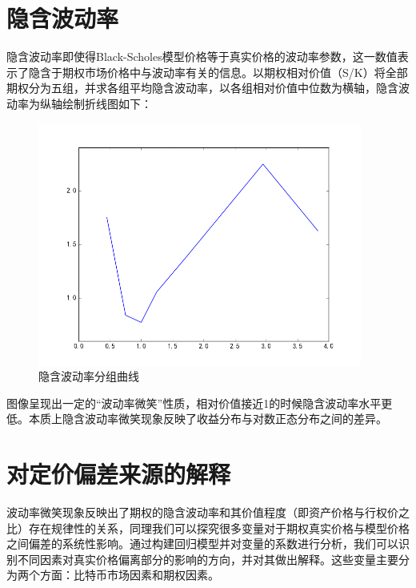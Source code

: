 {\section{隐含波动率}
隐含波动率即使得Black-Scholes模型价格等于真实价格的波动率参数，这一数值表示了隐含于期权市场价格中与波动率有关的信息。以期权相对价值（S/K）将全部期权分为五组，并求各组平均隐含波动率，以各组相对价值中位数为横轴，隐含波动率为纵轴绘制折线图如下：
\begin{figure}[H]
\begin{small}
\begin{center}
\includegraphics[width=0.95\textwidth]{figures/mean_isd.png}
\end{center}
\caption{隐含波动率分组曲线}
\label{fig:mean_isd}
\end{small}
\end{figure}
图像呈现出一定的“波动率微笑”性质，相对价值接近1的时候隐含波动率水平更低。本质上隐含波动率微笑现象反映了收益分布与对数正态分布之间的差异。

\section{对定价偏差来源的解释}\label{reg vars}
波动率微笑现象反映出了期权的隐含波动率和其价值程度（即资产价格与行权价之比）存在规律性的关系，同理我们可以探究很多变量对于期权真实价格与模型价格之间偏差的系统性影响。通过构建回归模型并对变量的系数进行分析，我们可以识别不同因素对真实价格偏离部分的影响的方向，并对其做出解释。这些变量主要分为两个方面：比特币市场因素和期权因素。
}
